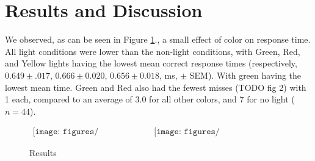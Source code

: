 \section{Results and Discussion}

We observed, as can be seen in Figure \ref{fig:results}., a small effect of
color on response time. All light conditions were lower than the non-light
conditions, with Green, Red, and Yellow lights having the lowest mean correct
response times (respectively, $0.649 \pm .017$, $0.666 \pm 0.020$, $0.656 \pm
0.018$, ms, $\pm$ SEM). With green having the lowest mean time. Green and Red
also had the fewest misses (TODO fig 2) with 1 each, compared to an average of
$3.0$ for all other colors, and $7$ for no light ($n=44$).


\vspace{2mm}
\begin{figure}[h!]
    \label{fig:results}
    \centering$
    \begin{array}{cc}
        \texttt{[image: figures/figure\_1.png]} &
        \texttt{[image: figures/figure\_2\_alt.png]}
    \end{array}$
    \caption{Results}
\end{figure}




